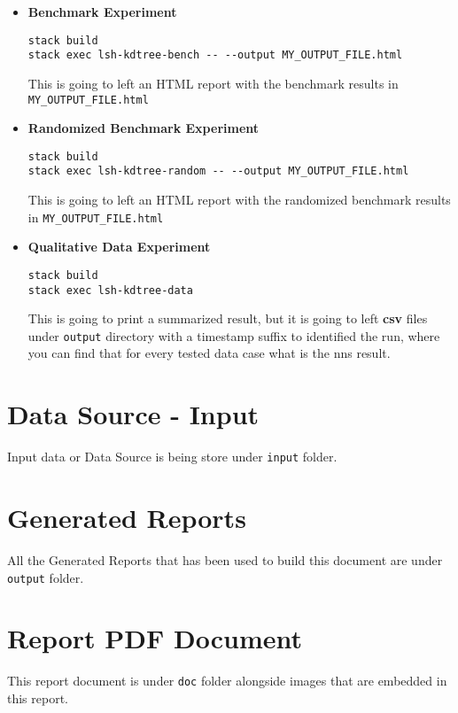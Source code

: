 \documentclass[12pt, a4paper]{article}
\begin{document}
\begin{itemize}
  \item \textbf{Benchmark Experiment}

\begin{verbatim}
stack build
stack exec lsh-kdtree-bench -- --output MY_OUTPUT_FILE.html
\end{verbatim}

This is going to left an HTML report with the benchmark results in \texttt{MY_OUTPUT_FILE.html}

\item \textbf{Randomized Benchmark Experiment}

\begin{verbatim}
stack build
stack exec lsh-kdtree-random -- --output MY_OUTPUT_FILE.html
\end{verbatim}

This is going to left an HTML report with the randomized benchmark results in \texttt{MY_OUTPUT_FILE.html}


\item \textbf{Qualitative Data Experiment}

\begin{verbatim}
stack build
stack exec lsh-kdtree-data
\end{verbatim}

This is going to print a summarized result, but it is going to left \textbf{csv} files under \texttt{output} directory with a timestamp suffix to identified the run, where you can find that for every tested data case what is the \acrshort{nns} result.

\end{itemize}

\section{Data Source - Input}\label{apx:data}
Input data or Data Source is being store under \texttt{input} folder.

\section{Generated Reports}
All the Generated Reports that has been used to build this document are under \texttt{output} folder.

\section{Report PDF Document}
This report document is under \texttt{doc} folder alongside images that are embedded in this report.
\end{document}
